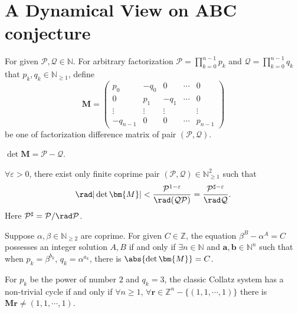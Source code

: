 \section{A Dynamical View on ABC conjecture}\label{sec:a-dynamical-view-on-abc-conjecture}

\begin{definition}\label{def:factorization-matrix}
	For given $\mathcal{P}, \mathcal{Q} \in \mathbb{N}$. For arbitrary factorization $\mathcal{P} = \prod_{k=0}^{n-1}p_k$ and $\mathcal{Q} = \prod_{k=0}^{n-1}q_k$ that $p_k, q_k \in \mathbb{N}_{\ge 1}$, define
\[ \bm{M} = \begin{pmatrix}
	p_{0} & -q_0 & 0 & \cdots & 0 \\
	0 & p_1 & -q_1 & \cdots & 0 \\
	\vdots & \vdots & \vdots & & \vdots \\
	-q_{n-1} & 0 & 0 & \cdots & p_{n-1}
\end{pmatrix} \]
be one of factorization difference matrix of pair $(\mathcal{P}, \mathcal{Q})$.
\end{definition}
\begin{proposition}\label{prop:det-factorization-matrix-is-diff}
	$\det\bm{M} = \mathcal{P} - \mathcal{Q}$.
\end{proposition}
\begin{example}\label{exa:rewitten-abc-conjecture}
	$\forall \varepsilon > 0$, there exist only finite coprime pair $(\mathcal{P}, \mathcal{Q}) \in \mathbb{N}_{\ge 1}^{2}$ such that
	\[ \rad\vert\det\bm{M}\vert < \frac{\mathcal{P}^{1-\varepsilon}}{\rad(\mathcal{Q}\mathcal{P})} = \frac{\mathcal{P}^{\sharp-\varepsilon}}{\rad\mathcal{Q}}. \]
	Here $\mathcal{P}^{\sharp} = \mathcal{P} / \rad\mathcal{P}$.
\end{example}
\begin{example}\label{exa:power-diff-to-dynamical-system}
	Suppose $\alpha, \beta \in \mathbb{N}_{\ge2}$ are coprime. For given $C \in \mathbb{Z}$, the equation $\beta^{B} - \alpha^{A} = C$ possesses an integer solution $A, B$ if and only if $\exists n \in \mathbb{N}$ and $\bm{a}, \bm{b} \in \mathbb{N}^{n}$ such that when $p_k = \beta^{b_k}$, $q_k = \alpha^{a_k}$, there is $\abs{\det\bm{M}} = C$.
\end{example}
\begin{example}\label{exa:collatz-cycle-system} 
	For $p_k$ be the power of number $2$ and $q_k = 3$, the classic Collatz system has a non-trivial cycle if and only if $\forall n \ge 1$, $\forall \bm{r} \in \mathbb{Z}^{n} - \{(1, 1, \cdots, 1)\}$ there is $\bm{M}\bm{r} \ne (1, 1, \cdots, 1)$.
\end{example}
